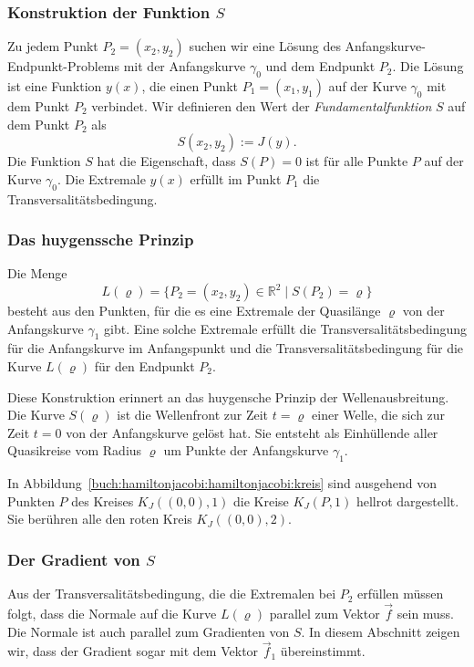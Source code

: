 %
%
\subsubsection{Konstruktion der Funktion $S$}
Zu jedem Punkt $P_2=(x_2,y_2)$ suchen wir eine Lösung des
Anfangskurve-Endpunkt-Problems mit der Anfangskurve $\gamma_0$
und dem Endpunkt $P_2$.
Die Lösung ist eine Funktion $y(x)$, die einen Punkt $P_1=(x_1,y_1)$ auf der
Kurve $\gamma_0$ mit dem Punkt $P_2$ verbindet.
Wir definieren den Wert der {\em Fundamentalfunktion} $S$ auf dem
%
Punkt $P_2$ als
\begin{equation}
S(x_2,y_2)
:=
J(y).
\label{buch:hamiltonjacobi:jacobi:eqn:Sdef}
\end{equation}
Die Funktion $S$ hat die Eigenschaft, dass $S(P)=0$ ist für alle
Punkte $P$ auf der Kurve $\gamma_0$.
Die Extremale $y(x)$ erfüllt im Punkt $P_1$ die Transversalitätsbedingung.

%
%
\subsubsection{Das huygenssche Prinzip}
%
%
Die Menge 
\[
L(\varrho)
=
\{
P_2=(x_2,y_2)\in\mathbb{R}^2
\mid
S(P_2)=\varrho
\}
\]
besteht aus den Punkten, für die es eine Extremale der Quasilänge
$\varrho$ von der Anfangskurve $\gamma_1$ gibt.
Eine solche Extremale erfüllt die Transversalitätsbedingung für die
Anfangskurve im Anfangspunkt und die Transversalitätsbedingung
für die Kurve $L(\varrho)$ für den Endpunkt $P_2$.

Diese Konstruktion erinnert an das huygensche Prinzip der Wellenausbreitung.
Die Kurve $S(\varrho)$ ist die Wellenfront zur Zeit $t=\varrho$ einer Welle,
die sich zur Zeit $t=0$ von der Anfangskurve gelöst hat.
Sie entsteht als Einhüllende aller Quasikreise vom Radius $\varrho$ 
um Punkte der Anfangskurve $\gamma_1$.

\begin{beispiel}
In Abbildung~\ref{buch:hamiltonjacobi:hamiltonjacobi:kreis} sind
ausgehend von Punkten $P$ des Kreises $K_J((0,0),1)$ die Kreise
$K_J(P,1)$ hellrot dargestellt.
Sie berühren alle den roten Kreis $K_J((0,0),2)$.
\end{beispiel}

%
%
\subsubsection{Der Gradient von $S$}
Aus der Transversalitätsbedingung, die die Extremalen bei $P_2$ erfüllen
müssen folgt, dass die Normale auf die Kurve $L(\varrho)$ parallel
zum Vektor $\vec{f}$ sein muss.
Die Normale ist auch parallel zum Gradienten von $S$.
In diesem Abschnitt zeigen wir, dass der Gradient sogar mit dem 
Vektor $\vec{f}_1$ übereinstimmt.

